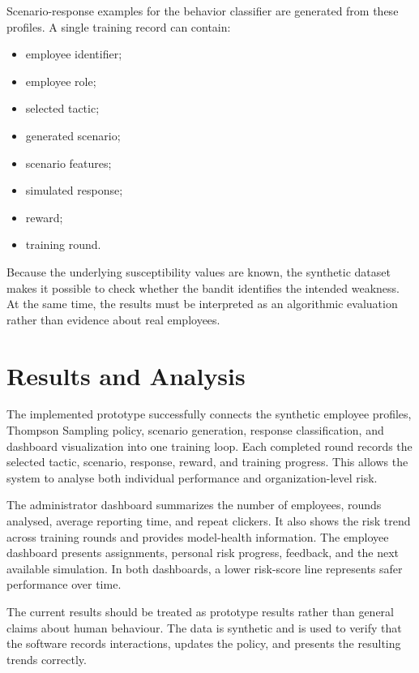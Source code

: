 \documentclass[12pt,a4paper]{article}
\begin{document}
Scenario-response examples for the behavior classifier are generated
from these profiles. A single training record can contain:

\begin{itemize}
    \item employee identifier;
    \item employee role;
    \item selected tactic;
    \item generated scenario;
    \item scenario features;
    \item simulated response;
    \item reward;
    \item training round.
\end{itemize}

Because the underlying susceptibility values are known, the synthetic
dataset makes it possible to check whether the bandit identifies the
intended weakness. At the same time, the results must be interpreted as
an algorithmic evaluation rather than evidence about real employees.



\section{Results and Analysis}

The implemented prototype successfully connects the synthetic employee
profiles, Thompson Sampling policy, scenario generation, response
classification, and dashboard visualization into one training loop.
Each completed round records the selected tactic, scenario, response,
reward, and training progress. This allows the system to analyse both
individual performance and organization-level risk.

The administrator dashboard summarizes the number of employees, rounds
analysed, average reporting time, and repeat clickers. It also shows the
risk trend across training rounds and provides model-health information.
The employee dashboard presents assignments, personal risk progress,
feedback, and the next available simulation. In both dashboards, a
lower risk-score line represents safer performance over time.

The current results should be treated as prototype results rather than
general claims about human behaviour. The data is synthetic and is used
to verify that the software records interactions, updates the policy,
and presents the resulting trends correctly.
\end{document}
